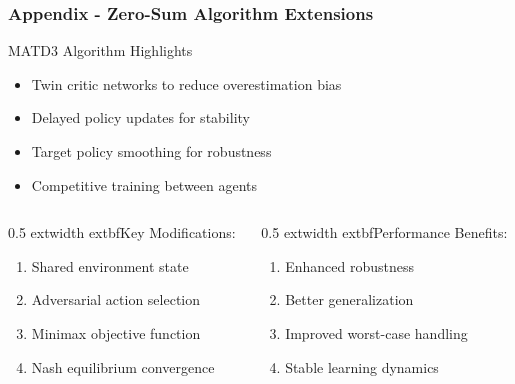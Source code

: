 \documentclass[
    11pt, %
    aspectratio=169, %
]{beamer}
\begin{document}
\begin{frame}[noframenumbering]
\label{Algorithm Details}
	\frametitle{Appendix - Zero-Sum Algorithm Extensions}
	
	\begin{block}{MATD3 Algorithm Highlights}
		\begin{itemize}
			\item Twin critic networks to reduce overestimation bias
			\item Delayed policy updates for stability
			\item Target policy smoothing for robustness
			\item Competitive training between agents
		\end{itemize}
	\end{block}
	
	\begin{columns}[t]
		\begin{column}{0.5	extwidth}
				extbf{Key Modifications:}
			\begin{enumerate}
				\item Shared environment state
				\item Adversarial action selection
				\item Minimax objective function
				\item Nash equilibrium convergence
			\end{enumerate}
		\end{column}
		\begin{column}{0.5	extwidth}
				extbf{Performance Benefits:}
			\begin{enumerate}
				\item Enhanced robustness
				\item Better generalization
				\item Improved worst-case handling
				\item Stable learning dynamics
			\end{enumerate}
		\end{column}
	\end{columns}
\end{frame}
\end{document}
